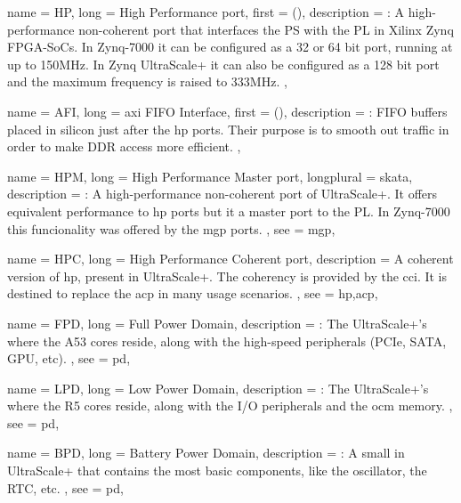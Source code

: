 {
	name = {HP},
	long = {High Performance port},
	first = { ()},
	description = {\emph{}:
		A high-performance non-coherent port that interfaces 
		the PS with the PL in Xilinx Zynq FPGA-SoCs.
		In Zynq-7000 it can be configured as a 32 or 64 bit port, running at up to 150MHz.
		In Zynq UltraScale+ it can also be configured as a 128 bit port and the maximum
		frequency is raised to 333MHz.
	},
}

{
	name = {AFI},
	long = {\gls{axi} FIFO Interface},
	first = { ()},
	description = {\emph{}:
		FIFO buffers placed in silicon just after the \gls{hp} ports. 
		Their purpose is to smooth out traffic in order to make DDR access more efficient.
	},
}

{
	name = {HPM},
	long = {High Performance Master port},
	longplural = {skata},
	description = {\emph{}:
		A high-performance non-coherent port of UltraScale+. 
		It offers equivalent performance to \gls{hp} ports but it a master port to the PL.
		In Zynq-7000 this funcionality was offered by the \gls{mgp} ports.
	},
	see = {mgp},
}

{
	name = {HPC},
	long = {High Performance Coherent port},
	description = {
		A coherent version of \gls{hp}, present in UltraScale+.
		The coherency is provided by the \gls{cci}.
		It is destined to replace the \gls{acp} in many usage scenarios.
	},
	see = {hp,acp},
}


{
	name = {FPD},
	long = {Full Power Domain},
	description = {\emph{}:
		The UltraScale+'s  where the A53 cores reside,
		along with the high-speed peripherals (PCIe, SATA, GPU, etc).
	},
	see = {pd},
}

{
	name = {LPD},
	long = {Low Power Domain},
	description = {\emph{}:
		The UltraScale+'s  where the R5 cores reside,
		along with the I/O peripherals and the \gls{ocm} memory.
	},
	see = {pd},
}

{
	name = {BPD},
	long = {Battery Power Domain},
	description = {\emph{}:
		A small  in UltraScale+ 
		that contains the most basic components,
		like the oscillator, the RTC, etc.
	},
	see = {pd},
}

